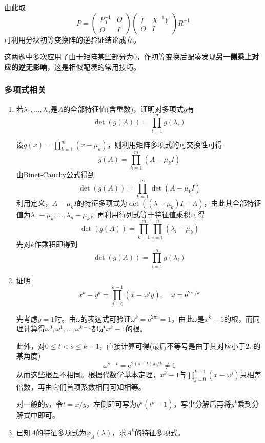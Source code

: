 \documentclass[a4paper,UTF8,fontset=windows]{ctexart}
\newcommand*{\note}{\noindent *}
\begin{document}
\begin{enumerate}
    由此取
    $$P=\begin{pmatrix}P_0^{-1}&O\\O&I\end{pmatrix}\begin{pmatrix}I&X^{-1}Y\\O&I\end{pmatrix}R^{-1}$$
    可利用分块初等变换阵的逆验证结论成立。
\end{enumerate}

\note 这两题中多次应用了由于矩阵某些部分为0，作初等变换后配凑发现\textbf{另一侧乘上对应的逆无影响}，这是相似配凑的常用技巧。

\subsubsection{多项式相关}
\begin{enumerate}
    \item 若$\lambda_1,\dots,\lambda_n$是$A$的全部特征值(含重数)，证明对多项式$g$有
    $$\det(g(A))=\prod_{i=1}^ng(\lambda_i)$$

    设$g(x)=\prod_{k=1}^m(x-\mu_k)$，则利用矩阵多项式的可交换性可得
    $$g(A)=\prod_{k=1}^m(A-\mu_kI)$$
    由Binet-Cauchy公式得到
    $$\det(g(A))=\prod_{k=1}^m\det(A-\mu_kI)$$
    利用定义，$A-\mu_kI$的特征多项式为$\det((\lambda+\mu_k)I-A)$，由此其全部特征值为$\lambda_1-\mu_k,\dots,\lambda_n-\mu_k$，再利用行列式等于特征值乘积可得
    $$\det(g(A))=\prod_{k=1}^m\prod_{i=1}^n(\lambda_i-\mu_k)$$
    先对$k$作乘积即得到
    $$\det(g(A))=\prod_{i=1}^ng(\lambda_i)$$

    \item 证明
    $$x^k-y^k=\prod_{j=0}^{k-1}(x-\omega^jy),\quad\omega=\mathrm{e}^{2\pi\mathrm{i}/k}$$

    先考虑$y=1$时。由$\omega$的表达式可验证$\omega^k=\mathrm{e}^{2\pi\mathrm{i}}=1$，由此$\omega$是$x^k-1$的根，而同理计算得$\omega^0,\omega^1,\dots,\omega^{k-1}$都是$x^k-1$的根。

    此外，对$0\le t<s\le k-1$，直接计算可得(最后不等号是由于其对应小于$2\pi$的某角度)
    $$\omega^{s-t}=\mathrm{e}^{2(s-t)\pi\mathrm{i}/k}\ne1$$
    从而这些根互不相同。根据代数学基本定理，$x^k-1$与$\prod_{j=0}^{k-1}(x-\omega^j)$只相差倍数，再由它们首项系数相同可知相等。

    对一般的$y$，令$t=x/y$，左侧即可写为$y^k(t^k-1)$，写出分解后再将$y^k$乘到分解式中即可。

    \item 已知$A$的特征多项式为$\varphi_A(\lambda)$，求$A^k$的特征多项式。


\end{enumerate}
\end{document}
